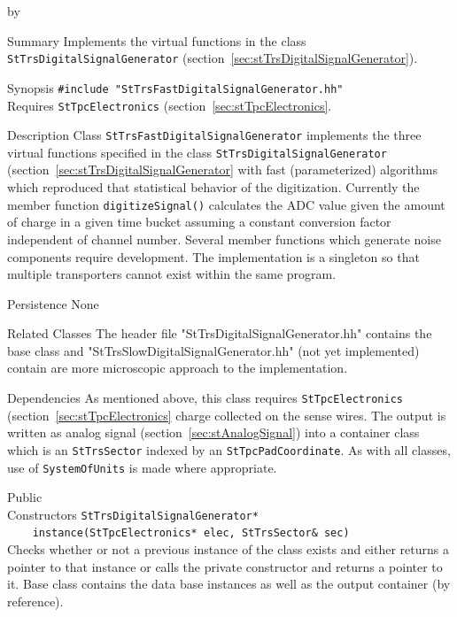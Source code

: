 \documentclass[twoside]{article}
\newcommand{\comp}[1]{\texttt{#1}}%
\newcommand{\entrylabel}[1]{\mbox{\textbf{{#1}}}\hfil}%
\newenvironment{entry}
{\begin{list}{}%
    {\renewcommand{\makelabel}{\entrylabel}%
     \setlength{\labelwidth}{90pt}%
     \setlength{\leftmargin}{\labelwidth}
     \advance\leftmargin by \labelsep%
      }%
    }%
  {\end{list}}
\newcommand{\Entrylabel}[1]%
{\raisebox{0pt}[1ex][0pt]{\makebox[\labelwidth][l]%
    {\parbox[t]{\labelwidth}{\hspace{0pt}\textbf{{#1}}}}}}
\newenvironment{Entry}%
{\renewcommand{\entrylabel}{\Entrylabel}\begin{entry}}%
  {\end{entry}}
\begin{document}
\begin{Entry}
\item[Summary]
  Implements the virtual functions in the class 
  \comp{StTrsDigitalSignalGenerator} 
  (section~\ref{sec:stTrsDigitalSignalGenerator}).

\item[Synopsis]
  \verb+#include "StTrsFastDigitalSignalGenerator.hh"+\\
  Requires \comp{StTpcElectronics} (section~\ref{sec:stTpcElectronics}.

\item[Description]
Class \comp{StTrsFastDigitalSignalGenerator} implements the three virtual
functions specified in the class \comp{StTrsDigitalSignalGenerator}
(section~\ref{sec:stTrsDigitalSignalGenerator} with fast (parameterized)
algorithms which reproduced that statistical behavior of the digitization.
Currently the member function \texttt{digitizeSignal()}
calculates the ADC value given the amount of charge in a given time
bucket assuming a constant conversion factor independent of channel number.
Several member functions which generate noise components require
development.
The implementation is a singleton  so that
multiple transporters cannot exist within the same program. 

\item[Persistence]
   None

\item[Related Classes]
The header file "StTrsDigitalSignalGenerator.hh" contains the base
class and "StTrsSlowDigitalSignalGenerator.hh" (not yet implemented)
contain are more microscopic approach to the implementation.

\item[Dependencies]
  As mentioned above, this class requires \comp{StTpcElectronics} 
  (section~\ref{sec:stTpcElectronics} 
  charge collected on the sense wires.  The output is written as analog
  signal (section~\ref{sec:stAnalogSignal}) into a container class which
  is an \comp{StTrsSector} indexed by an \comp{StTpcPadCoordinate}.  As
  with all classes, use of \comp{SystemOfUnits} is made where appropriate.

\item[Public \\ Constructors]
   \verb+StTrsDigitalSignalGenerator* +\\
   \verb+    instance(StTpcElectronics* elec, StTrsSector& sec)+\\
   Checks whether or not a previous instance of the class exists and
   either returns a pointer to that instance or calls the private constructor
   and returns a pointer to it.  Base class contains the data base
   instances as well as the output container (by reference).


\end{Entry}
\end{document}
